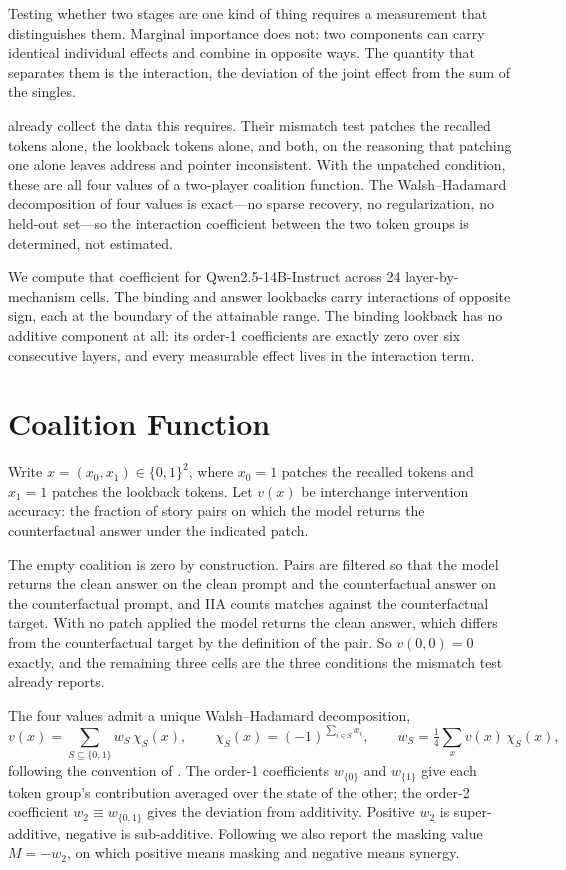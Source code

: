 \documentclass{article}
\begin{document}
Testing whether two stages are one kind of thing requires a measurement that distinguishes them. Marginal importance does not: two components can carry identical individual effects and combine in opposite ways. The quantity that separates them is the interaction, the deviation of the joint effect from the sum of the singles.

\citet{prakash2025lookback} already collect the data this requires. Their mismatch test patches the recalled tokens alone, the lookback tokens alone, and both, on the reasoning that patching one alone leaves address and pointer inconsistent. With the unpatched condition, these are all four values of a two-player coalition function. The Walsh--Hadamard decomposition of four values is exact---no sparse recovery, no regularization, no held-out set---so the interaction coefficient between the two token groups is determined, not estimated.

We compute that coefficient for Qwen2.5-14B-Instruct across 24 layer-by-mechanism cells. The binding and answer lookbacks carry interactions of opposite sign, each at the boundary of the attainable range. The binding lookback has no additive component at all: its order-1 coefficients are exactly zero over six consecutive layers, and every measurable effect lives in the interaction term.


\section{Coalition Function}

Write $x = (x_0, x_1) \in \{0,1\}^2$, where $x_0 = 1$ patches the recalled tokens and $x_1 = 1$ patches the lookback tokens. Let $v(x)$ be interchange intervention accuracy: the fraction of story pairs on which the model returns the counterfactual answer under the indicated patch.

The empty coalition is zero by construction. Pairs are filtered so that the model returns the clean answer on the clean prompt and the counterfactual answer on the counterfactual prompt, and IIA counts matches against the counterfactual target. With no patch applied the model returns the clean answer, which differs from the counterfactual target by the definition of the pair. So $v(0,0) = 0$ exactly, and the remaining three cells are the three conditions the mismatch test already reports.

The four values admit a unique Walsh--Hadamard decomposition,
\begin{equation}
  v(x) = \sum_{S \subseteq \{0,1\}} w_S\, \chi_S(x),
  \qquad
  \chi_S(x) = (-1)^{\sum_{i \in S} x_i},
  \qquad
  w_S = \tfrac{1}{4} \sum_{x} v(x)\, \chi_S(x),
\end{equation}
following the convention of \citet{poelwijk2016context}. The order-1 coefficients $w_{\{0\}}$ and $w_{\{1\}}$ give each token group's contribution averaged over the state of the other; the order-2 coefficient $w_2 \equiv w_{\{0,1\}}$ gives the deviation from additivity. Positive $w_2$ is super-additive, negative is sub-additive. Following \citet{tower2026epistatic} we also report the masking value $M = -w_2$, on which positive means masking and negative means synergy.
\end{document}
